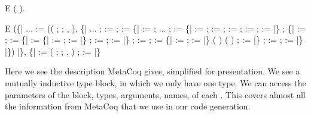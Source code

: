 \newcommand{\tmQuoteRec}{\hyperref[code:tmQuoteRec]{}}
\vspace{.2in}
\begin{SaveVerbatim}{E}
 (\tmQuoteRec{}\label{code:tmQuoteRec}  \fn{>>}\fn{=} ).
\end{SaveVerbatim}

\begin{SaveVerbatim}{E}
(\{| ...
    :=
     \dt{[}(( \dt{["Datatypes"}; ; \dt{]}, ),
        \{| ...
         ;  := \dt{[]}
         ;  := 
             \dt{[}\{|  :=  ; ...
               ;  := 
                   \dt{[}\{|  := 
                     ;  := \dt{[]} ;  := \dt{[]}
                     ;  :=   ;  :=  |\}
                  ; \{|  := 
                     ;  :=
                         \dt{[}\{|  := \{|  := 
                                           ;  :=  |\}
                           ;  := 
                           ;  :=   |\}\dt{]}
                     ;  := \dt{[]}
                     ;  :=
                          \{|  := 
                                ;  :=  |\} 
                          ( ) ( )
                     ;  :=  |\}\dt{]}
               ;  := \dt{[]} ;  :=  |\}\dt{]} |\})\dt{]} |\},
  \{|  := ( \dt{["Datatypes"}; ; \dt{]}, )
       ;  :=  |\} \dt{[])}
\end{SaveVerbatim}

\label{inspecting-inductive-types}

Here we see the description MetaCoq gives, simplified for presentation. We see a mutually \gls{inductive type} block, in which we only have one type. We can access the \gls{parameter}s of the block, types, arguments, names, \indices{} of each \constructor. This covers almost all the information from MetaCoq that we use in our code generation.


